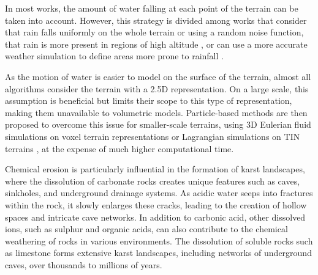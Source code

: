 In most works, the amount of water falling at each point of the terrain can be taken into account. However, this strategy is divided among works that consider that rain falls uniformly on the whole terrain or using a random noise function, that rain is more present in regions of high altitude \cite{Neidhold2005}, or can use a more accurate weather simulation to define areas more prone to rainfall \cite{Wojtek2022}.

As the motion of water is easier to model on the surface of the terrain, almost all algorithms consider the terrain with a 2.5D representation. On a large scale, this assumption is beneficial but limits their scope to this type of representation, making them unavailable to volumetric models. Particle-based methods are then proposed to overcome this issue for smaller-scale terrains, using 3D Eulerian fluid simulations on voxel terrain representations \cite{Benes2006} or Lagrangian simulations on TIN terrains \cite{Kristof2009}, at the expense of much higher computational time.


Chemical erosion is particularly influential in the formation of karst landscapes, where the dissolution of carbonate rocks creates unique features such as caves, sinkholes, and underground drainage systems. As acidic water seeps into fractures within the rock, it slowly enlarges these cracks, leading to the creation of hollow spaces and intricate cave networks. In addition to carbonic acid, other dissolved ions, such as sulphur and organic acids, can also contribute to the chemical weathering of rocks in various environments. The dissolution of soluble rocks such as limestone forms extensive karst landscapes, including networks of underground caves, over thousands to millions of years.

